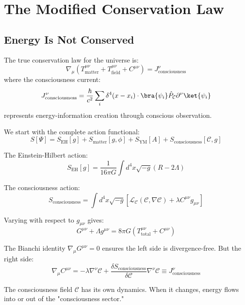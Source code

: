 \section{The Modified Conservation Law}

\subsection{Energy Is Not Conserved}

\begin{thm}\label{thm:modified-conservation}
The true conservation law for the universe is:
\begin{equation}
\boxed{\nabla_\mu \left( T^{\mu\nu}_{\text{matter}} + T^{\mu\nu}_{\text{field}} + C^{\mu\nu} \right) = J^\nu_{\text{consciousness}}}
\end{equation}
where the consciousness current:
\begin{equation}
J^\nu_{\text{consciousness}} = \frac{\hbar}{c^2} \sum_i \delta^4(x - x_i) \cdot \bra{\psi_i} \hat{P}_\mathcal{C} \partial^\nu \ket{\psi_i}
\end{equation}
represents energy-information creation through conscious observation.
\end{thm}

\begin{level2}
We start with the complete action functional:
\begin{equation}
S[\Psi] = S_{\text{EH}}[g] + S_{\text{matter}}[g,\phi] + S_{\text{YM}}[A] + S_{\text{consciousness}}[\mathcal{C},g]
\end{equation}

The Einstein-Hilbert action\cite{misner1973,wald1984,carroll2004}:
\begin{equation}
S_{\text{EH}}[g] = \frac{1}{16\pi G} \int d^4x \sqrt{-g} (R - 2\Lambda)
\end{equation}

The consciousness action:
\begin{equation}
S_{\text{consciousness}} = \int d^4x \sqrt{-g} \left[ \mathcal{L}_\mathcal{C}(\mathcal{C}, \nabla\mathcal{C}) + \lambda C^{\mu\nu} g_{\mu\nu} \right]
\end{equation}

Varying with respect to $g_{\mu\nu}$ gives:
\begin{equation}
G^{\mu\nu} + \Lambda g^{\mu\nu} = 8\pi G \left( T^{\mu\nu}_{\text{total}} + C^{\mu\nu} \right)
\end{equation}

The Bianchi identity $\nabla_\mu G^{\mu\nu} = 0$ ensures the left side is divergence-free. But the right side:
\begin{equation}
\nabla_\mu C^{\mu\nu} = -\lambda \nabla^\nu \mathcal{C} + \frac{\delta S_{\text{consciousness}}}{\delta \mathcal{C}} \nabla^\nu \mathcal{C} \equiv J^\nu_{\text{consciousness}}
\end{equation}

The consciousness field $\mathcal{C}$ has its own dynamics. When it changes, energy flows into or out of the "consciousness sector."
\end{level2}

